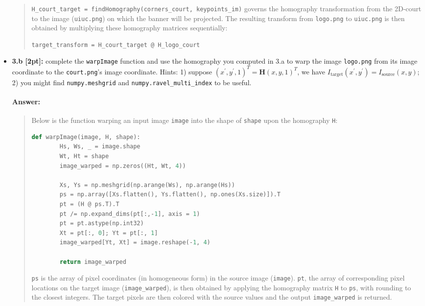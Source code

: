 \documentclass[11pt]{article}
\begin{document}
\begin{itemize}
\begin{quote}
    \verb|H_court_target = findHomography(corners_court, keypoints_im)| governs the homography transformation from the 2D-court to the image (\texttt{uiuc.png}) on which the banner will be projected. The resulting transform from \texttt{logo.png} to \texttt{uiuc.png} is then obtained by multiplying these homography matrices sequentially:
    
    \centering
    \verb|target_transform = H_court_target @ H_logo_court|
\end{quote}

\item \textbf{3.b [2pt]:} complete the \texttt{warpImage} function and use the homography you computed in 3.a to warp the image \texttt{logo.png} from its image coordinate to the \texttt{court.png}'s image coordinate. Hints: 1) suppose $(x^\prime, y^\prime, 1)^T = \mathbf{H} (x, y, 1)^T$, we have $I_\mathrm{target}(x^\prime, y^\prime) = I_\mathrm{source}(x, y)$; 2) you might find \texttt{numpy.meshgrid} and \texttt{numpy.ravel\_multi\_index} to be useful. 

\paragraph{Answer:} 
\begin{quote}
    Below is the function warping an input image \verb|image| into the shape of \verb|shape| upon the homography \verb|H|:
    \begin{lstlisting}[language=Python]
    def warpImage(image, H, shape):
        Hs, Ws, _ = image.shape
        Wt, Ht = shape
        image_warped = np.zeros((Ht, Wt, 4))

        Xs, Ys = np.meshgrid(np.arange(Ws), np.arange(Hs))
        ps = np.array([Xs.flatten(), Ys.flatten(), np.ones(Xs.size)]).T
        pt = (H @ ps.T).T
        pt /= np.expand_dims(pt[:,-1], axis = 1)
        pt = pt.astype(np.int32)
        Xt = pt[:, 0]; Yt = pt[:, 1]
        image_warped[Yt, Xt] = image.reshape(-1, 4)

        return image_warped
    \end{lstlisting}
    
    \verb|ps| is the array of pixel coordinates (in homogeneous form) in the source image (\verb|image|). \verb|pt|, the array of corresponding pixel locations on the target image (\verb|image_warped|), is then obtained by applying the homography matrix \verb|H| to \verb|ps|, with rounding to the closest integers. The target pixels are then colored with the source values and the output \verb|image_warped| is returned.


\end{quote}
\end{itemize}
\end{document}
